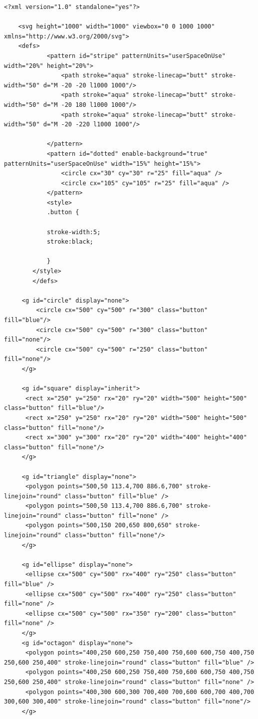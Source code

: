 \begin{lstlisting}[style=TypeScript, caption={SVG Image File}, label={lst:svgimagefile}]
    <?xml version="1.0" standalone="yes"?>

    <svg height="1000" width="1000" viewbox="0 0 1000 1000" xmlns="http://www.w3.org/2000/svg">
    <defs>
            <pattern id="stripe" patternUnits="userSpaceOnUse" width="20%" height="20%">
                <path stroke="aqua" stroke-linecap="butt" stroke-width="50" d="M -20 -20 l1000 1000"/>
                <path stroke="aqua" stroke-linecap="butt" stroke-width="50" d="M -20 180 l1000 1000"/>
                <path stroke="aqua" stroke-linecap="butt" stroke-width="50" d="M -20 -220 l1000 1000"/>

            </pattern>
            <pattern id="dotted" enable-background="true" patternUnits="userSpaceOnUse" width="15%" height="15%">
                <circle cx="30" cy="30" r="25" fill="aqua" />
                <circle cx="105" cy="105" r="25" fill="aqua" />
            </pattern>
            <style>
            .button {

            stroke-width:5;
            stroke:black;

            }
        </style>
        </defs>

     <g id="circle" display="none">
         <circle cx="500" cy="500" r="300" class="button" fill="blue"/>
         <circle cx="500" cy="500" r="300" class="button" fill="none"/>
         <circle cx="500" cy="500" r="250" class="button" fill="none"/>
     </g>

     <g id="square" display="inherit">
      <rect x="250" y="250" rx="20" ry="20" width="500" height="500" class="button" fill="blue"/>
      <rect x="250" y="250" rx="20" ry="20" width="500" height="500" class="button" fill="none"/>
      <rect x="300" y="300" rx="20" ry="20" width="400" height="400" class="button" fill="none"/>
     </g>

     <g id="triangle" display="none">
      <polygon points="500,50 113.4,700 886.6,700" stroke-linejoin="round" class="button" fill="blue" />
      <polygon points="500,50 113.4,700 886.6,700" stroke-linejoin="round" class="button" fill="none" />
      <polygon points="500,150 200,650 800,650" stroke-linejoin="round" class="button" fill="none"/>
     </g>

     <g id="ellipse" display="none">
      <ellipse cx="500" cy="500" rx="400" ry="250" class="button" fill="blue" />
      <ellipse cx="500" cy="500" rx="400" ry="250" class="button" fill="none" />
      <ellipse cx="500" cy="500" rx="350" ry="200" class="button" fill="none" />
     </g>
     <g id="octagon" display="none">
      <polygon points="400,250 600,250 750,400 750,600 600,750 400,750 250,600 250,400" stroke-linejoin="round" class="button" fill="blue" />
      <polygon points="400,250 600,250 750,400 750,600 600,750 400,750 250,600 250,400" stroke-linejoin="round" class="button" fill="none" />
      <polygon points="400,300 600,300 700,400 700,600 600,700 400,700 300,600 300,400" stroke-linejoin="round" class="button" fill="none"/>
     </g>


\end{lstlisting}
